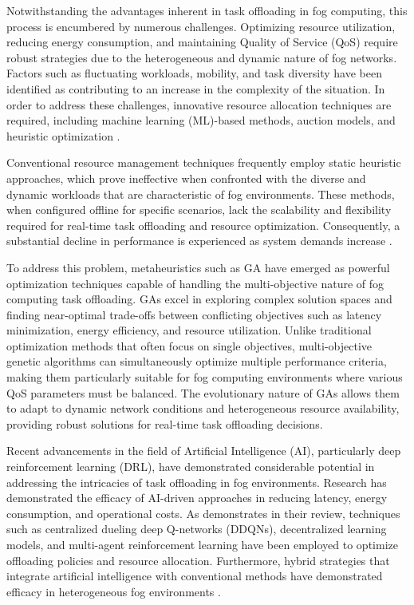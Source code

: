 \documentclass[preprint,12pt]{elsarticle}
\begin{document}
Notwithstanding the advantages inherent in task offloading in fog computing, this process is encumbered by numerous challenges. Optimizing resource utilization, reducing energy consumption, and maintaining Quality of Service (QoS) require robust strategies due to the heterogeneous and dynamic nature of fog networks. Factors such as fluctuating workloads, mobility, and task diversity have been identified as contributing to an increase in the complexity of the situation. In order to address these challenges, innovative resource allocation techniques are required, including machine learning (ML)-based methods, auction models, and heuristic optimization \cite{fahimullah_review_2022}.

Conventional resource management techniques frequently employ static heuristic approaches, which prove ineffective when confronted with the diverse and dynamic workloads that are characteristic of fog environments. These methods, when configured offline for specific scenarios, lack the scalability and flexibility required for real-time task offloading and resource optimization. Consequently, a substantial decline in performance is experienced as system demands increase \cite{iftikhar_ai-based_2023}.

To address this problem, metaheuristics such as GA have emerged as powerful optimization techniques capable of handling the multi-objective nature of fog computing task offloading. GAs excel in exploring complex solution spaces and finding near-optimal trade-offs between conflicting objectives such as latency minimization, energy efficiency, and resource utilization. Unlike traditional optimization methods that often focus on single objectives, multi-objective genetic algorithms can simultaneously optimize multiple performance criteria, making them particularly suitable for fog computing environments where various QoS parameters must be balanced. The evolutionary nature of GAs allows them to adapt to dynamic network conditions and heterogeneous resource availability, providing robust solutions for real-time task offloading decisions.

Recent advancements in the field of Artificial Intelligence (AI), particularly deep reinforcement learning (DRL), have demonstrated considerable potential in addressing the intricacies of task offloading in fog environments. Research has demonstrated the efficacy of AI-driven approaches in reducing latency, energy consumption, and operational costs. As \cite{fahimullah_review_2022} demonstrates in their review, techniques such as centralized dueling deep Q-networks (DDQNs), decentralized learning models, and multi-agent reinforcement learning have been employed to optimize offloading policies and resource allocation. Furthermore, hybrid strategies that integrate artificial intelligence with conventional methods have demonstrated efficacy in heterogeneous fog environments \cite{mishra_collaborative_2023}.
\end{document}
